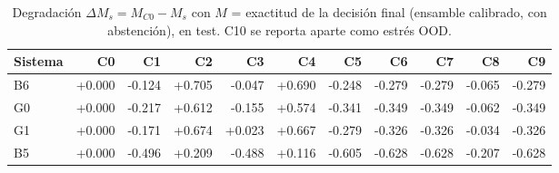 \begin{table}[H]\centering\footnotesize
\begin{tabular}{lrrrrrrrrrr}
\toprule
Sistema & C0 & C1 & C2 & C3 & C4 & C5 & C6 & C7 & C8 & C9 \\
\midrule
B6 & +0.000 & -0.124 & +0.705 & -0.047 & +0.690 & -0.248 & -0.279 & -0.279 & -0.065 & -0.279 \\
G0 & +0.000 & -0.217 & +0.612 & -0.155 & +0.574 & -0.341 & -0.349 & -0.349 & -0.062 & -0.349 \\
G1 & +0.000 & -0.171 & +0.674 & +0.023 & +0.667 & -0.279 & -0.326 & -0.326 & -0.034 & -0.326 \\
B5 & +0.000 & -0.496 & +0.209 & -0.488 & +0.116 & -0.605 & -0.628 & -0.628 & -0.207 & -0.628 \\
\bottomrule
\end{tabular}
\caption[Degradación por condición]{Degradación $\Delta M_s = M_{C0} - M_s$ con $M$ = exactitud de la decisión final (ensamble calibrado, con abstención), en test. C10 se reporta aparte como estrés OOD.}
\label{tab:delta_m}
\end{table}
